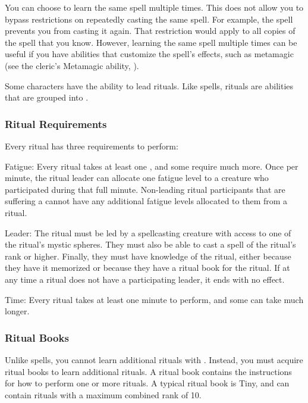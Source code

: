     You can choose to learn the same spell multiple times.
    This does not allow you to bypass restrictions on repeatedly casting the same spell.
    For example, the  spell  prevents you from casting it again.
    That restriction would apply to all copies of the spell that you know.
    However, learning the same spell multiple times can be useful if you have abilities that customize the spell's effects, such as metamagic (see the cleric's Metamagic ability, ).

    Some characters have the ability to lead rituals.
    Like spells, rituals are \magical abilities that are grouped into .

    \subsubsection{Ritual Requirements}\label{Ritual Requirements}
      Every ritual has three requirements to perform:
      \begin{raggeditemize}
        \item Fatigue: Every ritual takes at least one , and some require much more.
          Once per minute, the ritual leader can allocate one fatigue level to a creature who participated during that full minute.
          Non-leading ritual participants that are suffering a  cannot have any additional fatigue levels allocated to them from a ritual.
        \item Leader: The ritual must be led by a spellcasting creature with access to one of the ritual's mystic spheres.
          They must also be able to cast a spell of the ritual's rank or higher.
          Finally, they must have knowledge of the ritual, either because they have it memorized or because they have a ritual book for the ritual.
          If at any time a ritual does not have a participating leader, it ends with no effect.
        \item Time: Every ritual takes at least one minute to perform, and some can take much longer.
      \end{raggeditemize}

    \subsubsection{Ritual Books}\label{Ritual Books}
      Unlike spells, you cannot learn additional rituals with .
      Instead, you must acquire ritual books to learn additional rituals.
      A ritual book contains the instructions for how to perform one or more rituals.
      A typical ritual book is Tiny, and can contain rituals with a maximum combined rank of 10.

